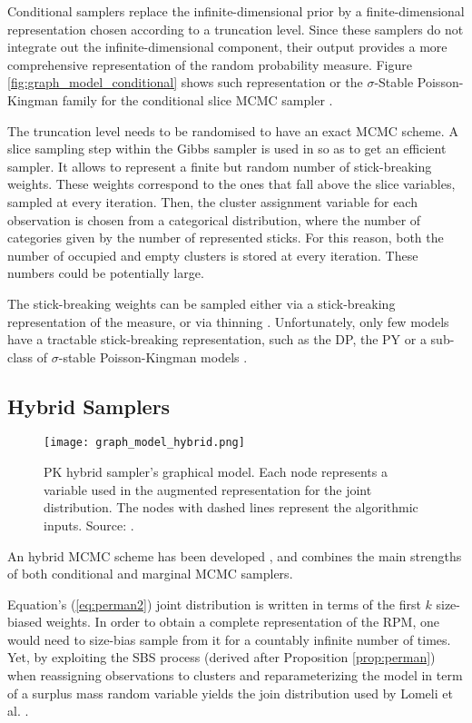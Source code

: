 Conditional samplers replace the infinite-dimensional prior by a finite-dimensional representation chosen according to a truncation level. Since these samplers do not integrate out the infinite-dimensional component, their output provides a more comprehensive representation of the random probability measure.
Figure \ref{fig:graph_model_conditional} shows such representation or the $\sigma$-Stable Poisson-Kingman family for the conditional slice \gls{MCMC} sampler \cite{FavaroWalker2012}.

The truncation level needs to be randomised to have an exact \gls{MCMC} scheme. A slice sampling step \cite{neal2003} within the Gibbs sampler is used in \cite{Favaro:2013fl} so as to get an efficient sampler.
It allows to represent a finite but random number of stick-breaking weights. These weights correspond to the ones that fall above the slice variables, sampled at every iteration. Then, the cluster assignment variable for each observation is chosen from a categorical distribution, where the number of categories given by the number of represented sticks. For this reason, both the number of occupied and empty clusters is stored at every iteration. These numbers could be potentially large.

The stick-breaking weights can be sampled either via a stick-breaking representation of the measure, or via thinning \cite{Favaro:2013fl}. Unfortunately, only few models have a tractable stick-breaking representation, such as the \gls{DP}, the \gls{PY} or a sub-class of $\sigma$-stable Poisson-Kingman models \cite{Favaro:2014bo}.


\subsection{Hybrid Samplers}
\begin{figure}[h!]
\centering
    \texttt{[image: graph\_model\_hybrid.png]} 
    \caption{PK hybrid sampler’s graphical model. Each node represents a variable used in the augmented representation for the joint distribution. The nodes with dashed lines represent the algorithmic inputs. Source: \cite{LomeliThesis}.} 
    \label{fig:graph_model_hybrid} 
\end{figure}

An hybrid \gls{MCMC} scheme has been developed \cite{Lomeli:2015vd}, and combines the main strengths of both conditional and marginal \gls{MCMC} samplers.

Equation's (\ref{eq:perman2}) joint distribution is written in terms of the first $k$ size-biased weights. In order to obtain a complete representation of the \gls{RPM}, one would need to size-bias sample from it for a countably infinite number of times.
Yet, by exploiting the \acrlong{SBS} process (derived after Proposition \ref{prop:perman}) when reassigning observations to clusters and reparameterizing the model in term of a surplus mass random variable yields the join distribution used by Lomeli et al. \cite{Lomeli:2015vd}.

